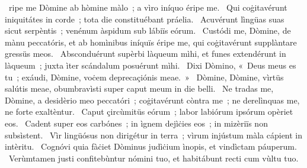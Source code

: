 \psalmChapterWithInscription{}
{ }
{%
~ripe me Dòmine ab hòmine màlo~; a vìro iníquo éripe me. 
~Qui coġitavérunt iniquitátes in corde~; tota die constituébant práelia. 
~Acuvérunt lìngüas suas sicut serpèntis~; venénum àspidum sub lábiïs eórum. 
~Custódi me, Dòmine, de mànu peccatóris, et ab homìnibus iníquïs éripe me, qui coġitavérunt supplàntare gressüs meos. 
~Absconduérunt supèrbi làqueum mìhi, et funes extendérunt in làqueum~; juxta ìter scándalum posuérunt mìhi. 
~Dixi Dòmino, «~Deus meus es tu~; exáudi, Dòmine, voċem deprecaçiónis meae.~»
~Dòmine, Dòmine, vìrtüs salútis meae, obumbravìsti super caput meum in die belli. 
~Ne tradas me, Dòmine, a desidèrio meo peccatóri~; coġitavérunt còntra me~; ne derelìnquas me, ne forte exaltèntur. 
~Caput çircùmitüs eórum~; labor labiórum ipsórum opèriet eos. 
~Cadent super eos carbónes~; in ìgnem dejìċies eos~; in mizèriïs non subsìstent. 
~Vìr lingüósus non dirigétur in terra~; vìrum injústum màla cápient in intèritu. 
~Cognóvi quia fàċiet Dòminus judìċium ìnopis, et vindìctam páuperum. 
~Verùmtamen justi confitebùntur nómini tuo, et habitábunt recti cum vùltu tuo. 
}
